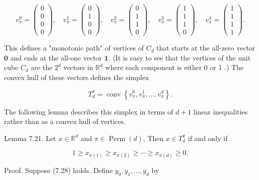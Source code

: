 \documentclass[12pt]{article}
\begin{document}
\[
v_{\pi}^{0}=\left(\begin{array}{l}
0  \tag{7.27}\\
0 \\
0 \\
0
\end{array}\right), \quad v_{\pi}^{1}=\left(\begin{array}{l}
0 \\
1 \\
0 \\
0
\end{array}\right), \quad v_{\pi}^{2}=\left(\begin{array}{l}
0 \\
1 \\
1 \\
0
\end{array}\right), \quad v_{\pi}^{3}=\left(\begin{array}{l}
1 \\
1 \\
1 \\
0
\end{array}\right), \quad v_{\pi}^{4}=\left(\begin{array}{l}
1 \\
1 \\
1 \\
1
\end{array}\right) .
\]

This defines a "monotonic path" of vertices of $C_{d}$ that starts at the all-zero vector $\mathbf{0}$ and ends at the all-one vector $\mathbf{1}$. (It is easy to see that the vertices of the unit cube $C_{d}$ are the $2^{d}$ vectors in $\mathbb{R}^{d}$ where each component is either 0 or 1 .) The convex hull of these vectors defines the simplex

$$
T_{d}^{\pi}=\operatorname{conv}\left\{v_{\pi}^{0}, v_{\pi}^{1}, \ldots, v_{\pi}^{d}\right\} .
$$

The following lemma describes this simplex in terms of $d+1$ linear inequalities rather than as a convex hull of vertices.

Lemma 7.21. Let $x \in \mathbb{R}^{d}$ and $\pi \in \operatorname{Perm}(d)$. Then $x \in T_{d}^{\pi}$ if and only if


\begin{equation*}
1 \geq x_{\pi(1)} \geq x_{\pi(2)} \geq \cdots \geq x_{\pi(d)} \geq 0 . \tag{7.28}
\end{equation*}


Proof. Suppose (7.28) holds. Define $y_{0}, y_{1}, \ldots, y_{d}$ by
\end{document}
